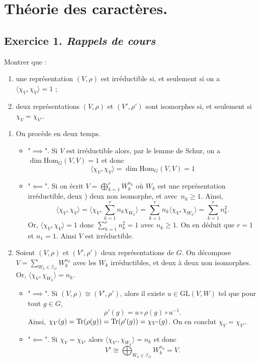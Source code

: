 \documentclass[./main]{subfiles}
\begin{document}
  \chapter{Théorie des caractères.}
  \minitoc

  \section{Exercice 1. \textit{Rappels de cours}}
  \begin{enonce}
    Montrer que :
    \begin{enumerate}
      \item une représentation $(V, \rho)$ est irréductible si, et seulement si on a $\langle \chi_V, \chi_V \rangle = 1$ ;
      \item deux représentations $(V, \rho)$ et  $(V', \rho')$ sont isomorphes si, et seulement si  $\chi_V = \chi_{V'}$.
    \end{enumerate}
  \end{enonce}

  \begin{enumerate}
    \item
      On procède en deux temps.
      \begin{itemize}
        \item "$\implies$". Si $V$ est irréductible alors, par le lemme de Schur, on a $\dim \mathrm{Hom}_G(V, V) = 1$ et donc \[
            \langle \chi_V, \chi_V \rangle = \dim \mathrm{Hom}_G(V, V) = 1
          \]
        \item "$\impliedby$".
          Si on écrit $V = \bigoplus_{k = 1}^r W_k^{n_k}$ où $W_k$ est une représentation irréductible, deux ) deux non isomorphe, et avec~$n_k \ge 1$.
          Ainsi,
          \[
            \langle \chi_V, \chi_V \rangle = \Big\langle \chi_V, \sum_{k=1}^r n_k \chi_{W_k} \Big\rangle = \sum_{k=1}^r n_k \langle \chi_V, \chi_{W_k} \rangle = \sum_{k=1}^r n_k^2
          .\]
          Or, $\langle \chi_V, \chi_V \rangle = 1$ donc $\sum_{k=1}^r n_k^2 = 1$ avec $n_k \ge 1$.
          On en déduit que $r = 1$ et $n_1 = 1$. 
          Ainsi $V$ est irréductible.
      \end{itemize}
    \item Soient $(V, \rho)$ et  $(V', \rho')$ deux représentations de  $G$.
      On décompose $V = \sum_{W_k \in \mathcal{I}_G} W_k^{n_k}$ avec les $W_k$ irréductibles, et deux à deux non isomorphes.
      Or, $\langle \chi_V, \chi_{W_k}\rangle = n_k$.
      \begin{itemize}
        \item "$\implies$".
          Si $(V, \rho) \cong (V', \rho')$, alors il existe  $u \in \mathrm{GL}(V, W)$
          tel que pour tout $g \in G$, \[
          \rho'(g) = u \circ \rho(g) \circ u^{-1}
          .\]
          Ainsi, $\chi_V(g) = \operatorname{Tr}(\rho(g)) = \operatorname{Tr}(\rho'(g)) = \chi_{V'}(g)$.
          On en conclut $\chi_V = \chi_{V'}$.
        \item "$\impliedby$".
          Si $\chi_V = \chi_{V'}$ alors $\langle \chi_{V'}, \chi_{W_k} \rangle = n_k$ et donc \[
          V' \cong \bigoplus_{W_k \in \mathcal{I}_G} W_k^{n_k} = V
          .\]
      \end{itemize}
  \end{enumerate}
\end{document}

